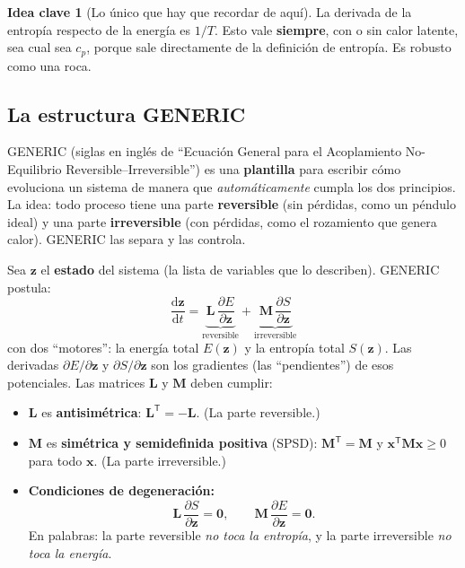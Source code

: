 \documentclass[11pt]{article}
\newcommand{\dd}{\mathrm{d}}
\theoremstyle{definition}
\newtheorem{idea}{Idea clave}[section]
\theoremstyle{plain}
\begin{document}
\begin{idea}[Lo único que hay que recordar de aquí]
La derivada de la entropía respecto de la energía es $1/T$. Esto vale
\textbf{siempre}, con o sin calor latente, sea cual sea $c_p$, porque sale
directamente de la definición de entropía. Es robusto como una roca.
\end{idea}

\subsection{La estructura GENERIC}

GENERIC (siglas en inglés de ``Ecuación General para el Acoplamiento
No-Equilibrio Reversible--Irreversible'') es una \textbf{plantilla} para escribir
cómo evoluciona un sistema de manera que \emph{automáticamente} cumpla los dos
principios. La idea: todo proceso tiene una parte \textbf{reversible} (sin
pérdidas, como un péndulo ideal) y una parte \textbf{irreversible} (con pérdidas,
como el rozamiento que genera calor). GENERIC las separa y las controla.

Sea $\bm z$ el \textbf{estado} del sistema (la lista de variables que lo
describen). GENERIC postula:
\begin{equation}
  \boxed{\;
  \frac{\dd \bm z}{\dd t}
  = \underbrace{\bm L\,\frac{\partial E}{\partial \bm z}}_{\text{reversible}}
  + \underbrace{\bm M\,\frac{\partial S}{\partial \bm z}}_{\text{irreversible}}
  \;}
  \label{eq:generic}
\end{equation}
con dos ``motores'': la energía total $E(\bm z)$ y la entropía total $S(\bm z)$.
Las derivadas $\partial E/\partial\bm z$ y $\partial S/\partial\bm z$ son los
gradientes (las ``pendientes'') de esos potenciales. Las matrices $\bm L$ y $\bm M$
deben cumplir:
\begin{itemize}[leftmargin=1.5em]
  \item $\bm L$ es \textbf{antisimétrica}: $\bm L^{\mathsf T}=-\bm L$. (La parte
  reversible.)
  \item $\bm M$ es \textbf{simétrica y semidefinida positiva} (SPSD):
  $\bm M^{\mathsf T}=\bm M$ y $\bm x^{\mathsf T}\bm M\bm x\ge 0$ para todo $\bm x$.
  (La parte irreversible.)
  \item \textbf{Condiciones de degeneración:}
  \begin{equation}
    \bm L\,\frac{\partial S}{\partial \bm z}=\bm 0,
    \qquad
    \bm M\,\frac{\partial E}{\partial \bm z}=\bm 0.
    \label{eq:degen}
  \end{equation}
  En palabras: la parte reversible \emph{no toca la entropía}, y la parte
  irreversible \emph{no toca la energía}.
\end{itemize}
\end{document}
